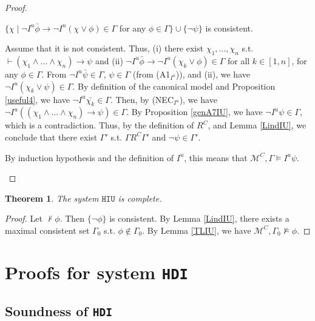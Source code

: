 \documentclass{article}
\newtheorem{theor}{Theorem}
\begin{document}
\begin{proof}
\begin{itemize}
$\{\chi \mid \neg I^{u}\bar{\phi} \rightarrow \neg I^{u}(\chi \vee \phi) \in \Gamma$ for any $
\phi \in \Gamma \} \cup \{\neg \psi\}$ is consistent.



Assume that it is not consistent. Thus, (i) there exist $\chi_{1}, ..., \chi_{n}$ s.t. $\vdash (\chi_{1} \wedge ... \wedge \chi_{n}) \rightarrow \psi$ and (ii) $\neg I^{u} \bar{\phi} \rightarrow \neg I^{u}(\chi_{k} \vee \phi) \in \Gamma$ for all $k \in [1, n]$, for any $\phi \in \Gamma$. From $\neg I^{u} \bar{\psi} \in \Gamma$, $\psi \in \Gamma$ (from (A1$_{I^{u}}$)), and (ii), we have $\neg I^{u}(\chi_{k} \vee \psi) \in \Gamma$. By definition of the canonical model and Proposition \ref{useful4}, we have $\neg I^{u} \bar{\chi_{k}} \in \Gamma$. Then, by (NEC$_{I^{u}}$), we have $\neg I^{u} ((\chi_{1} \wedge ... \wedge \chi_{n}) \rightarrow \psi) \in \Gamma$. By Proposition \ref{genA7IU}, we have $\neg I^{u} \psi \in \Gamma$, which is a contradiction. Thus, by the definition of $R^{C}$, and Lemma \ref{LindIU}, we conclude that there exist $\Gamma'$ s.t. $\Gamma R^{C} \Gamma'$ and $\neg \psi \in \Gamma'$. 

By induction hypothesis and the definition of $I^{u}$, this means that $\mathcal{M}^{C}, \Gamma \models I^{u} \psi$.




\end{itemize}

\end{proof}

\begin{theor}

The system $\mathtt{HIU}$ is complete.

\end{theor}

\begin{proof}

Let $\not \vdash \phi$. Then $\{\neg \phi\}$ is consistent. By Lemma \ref{LindIU}, there exists a maximal consistent set $\Gamma_{0}$ s.t. $\phi \not \in \Gamma_{0}$. By Lemma \ref{TLIU}, we have $\mathcal{M}^{C}, \Gamma_{0} \not \models \phi$.

\end{proof}


\section{Proofs for system \texttt{HDI}}

\subsection{Soundness of \texttt{HDI}}
\label{appHDIsound}
\end{document}
